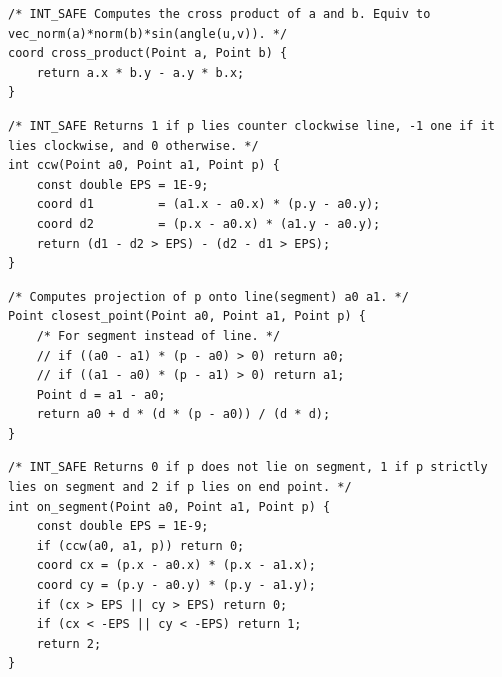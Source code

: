 \documentclass[a4paper,10pt]{article}
\newenvironment{keepfunction}{\begin{samepage}}{\end{samepage}}
\begin{document}
\begin{keepfunction}
\begin{verbatim}
/* INT_SAFE Computes the cross product of a and b. Equiv to vec_norm(a)*norm(b)*sin(angle(u,v)). */
coord cross_product(Point a, Point b) {
    return a.x * b.y - a.y * b.x;
}
\end{verbatim}
\end{keepfunction}

\begin{keepfunction}
\begin{verbatim}
/* INT_SAFE Returns 1 if p lies counter clockwise line, -1 one if it lies clockwise, and 0 otherwise. */
int ccw(Point a0, Point a1, Point p) {
    const double EPS = 1E-9;
    coord d1         = (a1.x - a0.x) * (p.y - a0.y);
    coord d2         = (p.x - a0.x) * (a1.y - a0.y);
    return (d1 - d2 > EPS) - (d2 - d1 > EPS);
}
\end{verbatim}
\end{keepfunction}

\begin{keepfunction}
\begin{verbatim}
/* Computes projection of p onto line(segment) a0 a1. */
Point closest_point(Point a0, Point a1, Point p) {
    /* For segment instead of line. */
    // if ((a0 - a1) * (p - a0) > 0) return a0;
    // if ((a1 - a0) * (p - a1) > 0) return a1;
    Point d = a1 - a0;
    return a0 + d * (d * (p - a0)) / (d * d);
}
\end{verbatim}
\end{keepfunction}

\begin{keepfunction}
\begin{verbatim}
/* INT_SAFE Returns 0 if p does not lie on segment, 1 if p strictly lies on segment and 2 if p lies on end point. */
int on_segment(Point a0, Point a1, Point p) {
    const double EPS = 1E-9;
    if (ccw(a0, a1, p)) return 0;
    coord cx = (p.x - a0.x) * (p.x - a1.x);
    coord cy = (p.y - a0.y) * (p.y - a1.y);
    if (cx > EPS || cy > EPS) return 0;
    if (cx < -EPS || cy < -EPS) return 1;
    return 2;
}
\end{verbatim}
\end{keepfunction}
\end{document}
